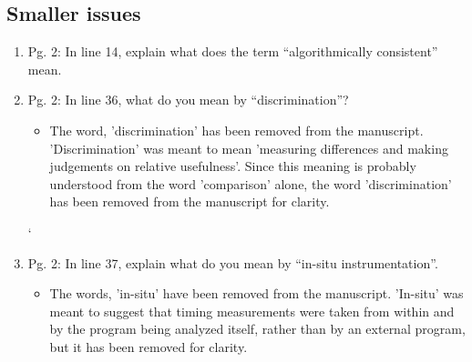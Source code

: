 \documentclass{article}
\begin{document}
  \subsection*{Smaller issues}
  \begin{enumerate}

  \item
	Pg. 2: In line 14, explain what does the term “algorithmically consistent” mean.

{\color{red}
  }

  \item
	Pg. 2: In line 36, what do you mean by “discrimination”?

{\color{red}  
\begin{itemize}
     \item
      The word, 'discrimination' has been removed from the manuscript. 'Discrimination' was meant to mean 'measuring differences and making judgements on relative usefulness'. Since this meaning is probably understood from the word 'comparison' alone, the word 'discrimination' has been removed from the manuscript for clarity.
  \end{itemize}}
	
` \item	
	Pg. 2: In line 37, explain what do you mean by “in-situ instrumentation”.

{\color{red}  
\begin{itemize}
     \item
      The words, 'in-situ' have been removed from the manuscript. 'In-situ' was meant to suggest that timing measurements were taken from within and by the program being analyzed itself, rather than by an external program, but it has been removed for clarity.
  \end{itemize}}
	

\end{enumerate}
\end{document}
